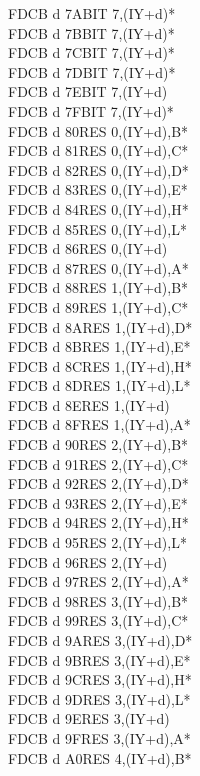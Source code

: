 \documentclass[oneside,a4paper]{book}
\begin{document}
\begin{multicols}{3}
{\begin{tabbing}
FDCB d 7A\>BIT 7,(IY+d)*\\
FDCB d 7B\>BIT 7,(IY+d)*\\
FDCB d 7C\>BIT 7,(IY+d)*\\
FDCB d 7D\>BIT 7,(IY+d)*\\
FDCB d 7E\>BIT 7,(IY+d)\\
FDCB d 7F\>BIT 7,(IY+d)*\\
FDCB d 80\>RES 0,(IY+d),B*\\
FDCB d 81\>RES 0,(IY+d),C*\\
FDCB d 82\>RES 0,(IY+d),D*\\
FDCB d 83\>RES 0,(IY+d),E*\\
FDCB d 84\>RES 0,(IY+d),H*\\
FDCB d 85\>RES 0,(IY+d),L*\\
FDCB d 86\>RES 0,(IY+d)\\
FDCB d 87\>RES 0,(IY+d),A*\\
FDCB d 88\>RES 1,(IY+d),B*\\
FDCB d 89\>RES 1,(IY+d),C*\\
FDCB d 8A\>RES 1,(IY+d),D*\\
FDCB d 8B\>RES 1,(IY+d),E*\\
FDCB d 8C\>RES 1,(IY+d),H*\\
FDCB d 8D\>RES 1,(IY+d),L*\\
FDCB d 8E\>RES 1,(IY+d)\\
FDCB d 8F\>RES 1,(IY+d),A*\\
FDCB d 90\>RES 2,(IY+d),B*\\
FDCB d 91\>RES 2,(IY+d),C*\\
FDCB d 92\>RES 2,(IY+d),D*\\
FDCB d 93\>RES 2,(IY+d),E*\\
FDCB d 94\>RES 2,(IY+d),H*\\
FDCB d 95\>RES 2,(IY+d),L*\\
FDCB d 96\>RES 2,(IY+d)\\
FDCB d 97\>RES 2,(IY+d),A*\\
FDCB d 98\>RES 3,(IY+d),B*\\
FDCB d 99\>RES 3,(IY+d),C*\\
FDCB d 9A\>RES 3,(IY+d),D*\\
FDCB d 9B\>RES 3,(IY+d),E*\\
FDCB d 9C\>RES 3,(IY+d),H*\\
FDCB d 9D\>RES 3,(IY+d),L*\\
FDCB d 9E\>RES 3,(IY+d)\\
FDCB d 9F\>RES 3,(IY+d),A*\\
FDCB d A0\>RES 4,(IY+d),B*\\

\end{tabbing}}
\end{multicols}
\end{document}
